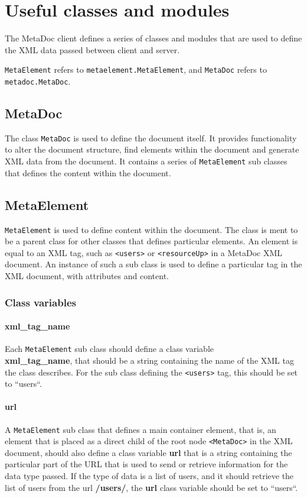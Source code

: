 \newpage
\section{Useful classes and modules}
\label{sec:useful_classes}
The MetaDoc client defines a series of classes and modules that are used to
define the XML data passed between client and server. 

\texttt{MetaElement} refers to \texttt{metaelement.MetaElement}, and
\texttt{MetaDoc} refers to \\ \texttt{metadoc.MetaDoc}.

\subsection{MetaDoc}
The class \texttt{MetaDoc} is used to define the document itself. It provides
functionality to alter the document structure, find elements within the
document and generate XML data from the document. It contains a series of
\texttt{MetaElement} sub classes that defines the content within the document.

\subsection{MetaElement}
\texttt{MetaElement} is used to define content within the document.  The class
is ment to be a parent class for other classes that defines particular
elements. An element is equal to an XML tag, such as \texttt{<users>} or
\texttt{<resourceUp>} in a MetaDoc XML document. An instance of such a sub
class is used to define a particular tag in the XML document, with attributes
and content.  

\subsubsection{Class variables}

\paragraph{xml\_tag\_name}
Each \texttt{MetaElement} sub class should define a class variable \\
\textbf{xml\_tag\_name}, that should be a string containing the name of the XML
tag the class describes. For the sub class defining the \texttt{<users>} tag,
this should be set to ``users``. 

\paragraph{url}
A \texttt{MetaElement} sub class that defines a main container element, that
is, an element that is placed as a direct child of the root node
\texttt{<MetaDoc>} in the XML document, should also define a class variable
\textbf{url} that is a string containing the particular part of the URL that is
used to send or retrieve information for the data type passed. If the type of
data is a list of users, and it should retrieve the list of users from the url
\textbf{/users/}, the \textbf{url} class variable should be set to
``users``.

